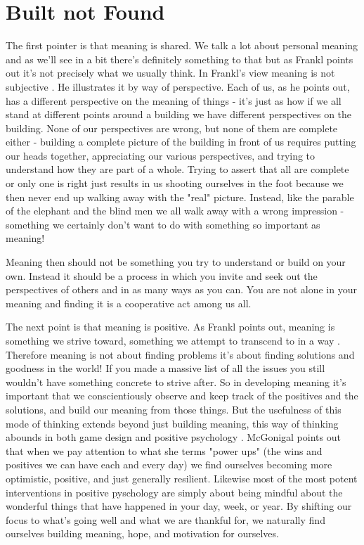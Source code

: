 \documentclass[11pt,a5paper]{book}
\begin{document}
\section{Built not Found}
The first pointer is that meaning is shared. We talk a lot about personal meaning and as we'll see in a bit there's definitely something to that but as Frankl points out it's not precisely what we usually think. In Frankl's view meaning is not subjective \cite{frankl}. He illustrates it by way of perspective. Each of us, as he points out, has a different perspective on the meaning of things - it's just as how if we all stand at different points around a building we have different perspectives on the building. None of our perspectives are wrong, but none of them are complete either - building a complete picture of the building in front of us requires putting our heads together, appreciating our various perspectives, and trying to understand how they are part of a whole. Trying to assert that all are complete or only one is right just results in us shooting ourselves in the foot because we then never end up walking away with the "real" picture. Instead, like the parable of the elephant and the blind men we all walk away with a wrong impression - something we certainly don't want to do with something so important as meaning! 
\newline

Meaning then should not be something you try to understand or build on your own. Instead it should be a process in which you invite and seek out the perspectives of others and in as many ways as you can. You are not alone in your meaning and finding it is a cooperative act among us all. 
\newline

The next point is that meaning is positive. As Frankl points out, meaning is something we strive toward, something we attempt to transcend to in a way \cite{frankl}. Therefore meaning is not about finding problems it's about finding solutions and goodness in the world! If you made a massive list of all the issues you still wouldn't have something concrete to strive after. So in developing meaning it's important that we conscientiously observe and keep track of the positives and the solutions, and build our meaning from those things. But the usefulness of this mode of thinking extends beyond just building meaning, this way of thinking abounds in both game design \cite{superbetter} and positive psychology \cite{seligman}. McGonigal points out that when we pay attention to what she terms "power ups" (the wins and positives we can have each and every day) we find ourselves becoming more optimistic, positive, and just generally resilient. Likewise most of the most potent interventions in positive pyschology are simply about being mindful about the wonderful things that have happened in your day, week, or year. By shifting our focus to what's going well and what we are thankful for, we naturally find ourselves building meaning, hope, and motivation for ourselves. 
\newline
\end{document}
